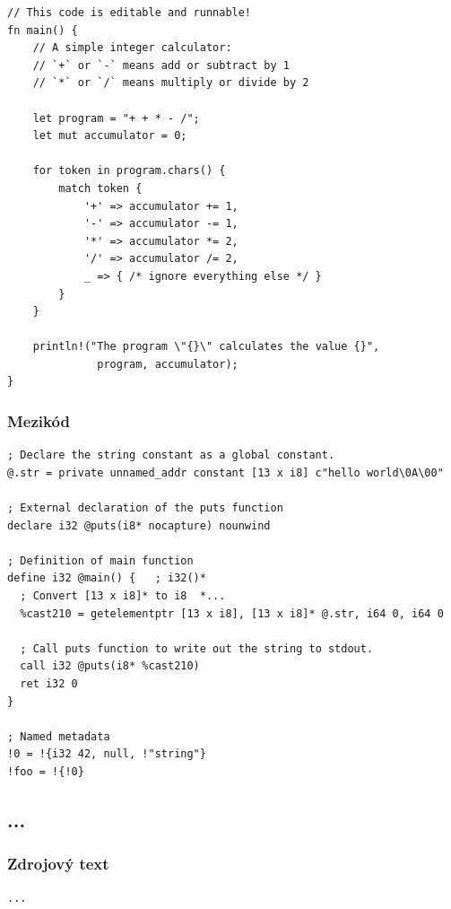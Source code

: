 \documentclass[12pt,a4paper]{article}
\begin{document}
\begin{verbatim}
// This code is editable and runnable!
fn main() {
    // A simple integer calculator:
    // `+` or `-` means add or subtract by 1
    // `*` or `/` means multiply or divide by 2

    let program = "+ + * - /";
    let mut accumulator = 0;

    for token in program.chars() {
        match token {
            '+' => accumulator += 1,
            '-' => accumulator -= 1,
            '*' => accumulator *= 2,
            '/' => accumulator /= 2,
            _ => { /* ignore everything else */ }
        }
    }

    println!("The program \"{}\" calculates the value {}",
              program, accumulator);
}
\end{verbatim}


\subsubsection{Mezikód}

\begin{verbatim}
; Declare the string constant as a global constant.
@.str = private unnamed_addr constant [13 x i8] c"hello world\0A\00"

; External declaration of the puts function
declare i32 @puts(i8* nocapture) nounwind

; Definition of main function
define i32 @main() {   ; i32()*
  ; Convert [13 x i8]* to i8  *...
  %cast210 = getelementptr [13 x i8], [13 x i8]* @.str, i64 0, i64 0

  ; Call puts function to write out the string to stdout.
  call i32 @puts(i8* %cast210)
  ret i32 0
}

; Named metadata
!0 = !{i32 42, null, !"string"}
!foo = !{!0}
\end{verbatim}

\subsection{...}

\subsubsection{Zdrojový text}

\begin{verbatim}
...
\end{verbatim}
\end{document}
